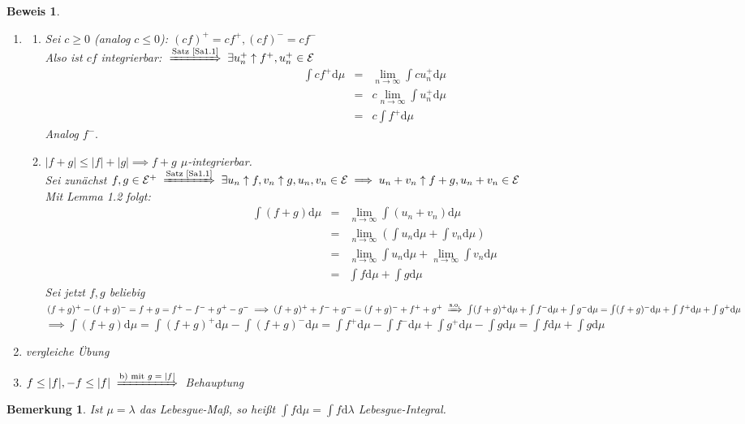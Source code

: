 \documentclass[a4paper,11pt]{book}
\def\EE{ \mathcal{E} }
\def\folgt{\ensuremath{\implies}}
\newcommand{\folgtnach}[1]{\ensuremath{\DOTSB\;\xRightarrow{\text{#1}}\;}}
\newtheorem*{BemON}{Bemerkung}
\theoremstyle{nonumberplain}
\newtheorem{Bew}{Beweis}
\begin{document}
\begin{Bew}
\begin{enumerate}
\item[a)]
\begin{enumerate}
\item[$\alpha$)] Sei $c\ge 0$ (analog $c\le 0$): $(cf)^+=cf^+, (cf)^-=cf^-$\\
Also ist $cf$ integrierbar: $\folgtnach{Satz \ref{Sa1.1}}\exists u_n^+\uparrow f^+, u_n^+\in\EE$
\begin{eqnarray*}
\int cf^+\mbox{d}\mu &=& \lim_{n\to\infty}\int cu_n^+\mbox{d}\mu\\
&=& c\lim_{n\to\infty}\int u_n^+\mbox{d}\mu\\
&=& c\int f^+\mbox{d}\mu
\end{eqnarray*}
Analog $f^-.$
\item[$\beta$)] $|f+g|\le |f|+|g|\folgt f+g$ $\mu$-integrierbar.\\
Sei zunächst $f,g\in\EE^+\folgtnach{Satz \ref{Sa1.1}}\exists u_n\uparrow f, v_n\uparrow g, u_n, v_n\in\EE\folgt u_n+v_n\uparrow f+g, u_n+v_n\in\EE$\\
Mit Lemma 1.2 folgt:
\begin{eqnarray*}
\int(f+g)\mbox{d}\mu &=& \lim_{n\to\infty}\int(u_n+v_n)\mbox{d}\mu\\
&=& \lim_{n\to\infty}(\int u_n\mbox{d}\mu+\int v_n\mbox{d}\mu)\\
&=& \lim_{n\to\infty}\int u_n\mbox{d}\mu+\lim_{n\to\infty}\int v_n\mbox{d}\mu\\
&=& \int f\mbox{d}\mu + \int g\mbox{d}\mu
\end{eqnarray*}
Sei jetzt $f, g$ beliebig\\
$(f+g)^+ -(f+g)^-= f+g=f^+-f^-+g^+-g^-\folgt (f+g)^++f^-+g^-=(f+g)^-+f^++g^+\folgtnach{s.o.}\int (f+g)^+\mbox{d}\mu+\int f^-\mbox{d}\mu+\int g^-\mbox{d}\mu=\int (f+g)^-\mbox{d}\mu+\int f^+\mbox{d}\mu +\int g^+\mbox{d}\mu$\\
$\folgt\int(f+g)\mbox{d}\mu=\int(f+g)^+\mbox{d}\mu-\int(f+g)^-\mbox{d}\mu=\int f^+\mbox{d}\mu - \int f^-\mbox{d}\mu + \int g^+\mbox{d}\mu -\int g\mbox{d}\mu=\int f\mbox{d}\mu + \int g\mbox{d}\mu$
\end{enumerate}
\item[b)] vergleiche Übung
\item[c)] $f\le|f|, -f\le|f|\folgtnach{b) mit $g=|f|$}$ Behauptung
\end{enumerate}
\end{Bew}

\begin{BemON} Ist $\mu=\lambda$ das Lebesgue-Maß, so heißt $\int f\mbox{d}\mu=\int f\mbox{d}\lambda$ Lebesgue-Integral.
\end{BemON}
\end{document}
